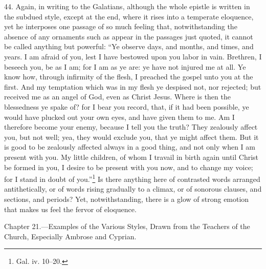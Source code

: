 44. Again, in writing to the Galatians, although the whole epistle is written in the subdued style, except at the end, where it rises into a temperate eloquence, yet he interposes one passage of so much feeling that, notwithstanding the absence of any ornaments such as appear in the passages just quoted, it cannot be called anything but powerful: “Ye observe days, and months, and times, and years. I am afraid of you, lest I have bestowed upon you labor in vain. Brethren, I beseech you, be as I am; for I am as ye are: ye have not injured me at all. Ye know how, through infirmity of the flesh, I preached the gospel unto you at the first. And my temptation which was in my flesh ye despised not, nor rejected; but received me as an angel of God, even as Christ Jesus. Where is then the blessedness ye spake of? for I bear you record, that, if it had been possible, ye would have plucked out your own eyes, and have given them to me. Am I therefore become your enemy, because I tell you the truth? They zealously affect you, but not well; yea, they would exclude you, that ye might affect them. But it is good to be zealously affected always in a good thing, and not only when I am present with you. My little children, of whom I travail in birth again until Christ be formed in you, I desire to be present with you now, and to change my voice; for I stand in doubt of you.”\footnote{Gal. iv. 10–20.} Is there anything here of contrasted words arranged antithetically, or of words rising gradually to a climax, or of sonorous clauses, and sections, and periods? Yet, notwithstanding, there is a glow of strong emotion that makes us feel the fervor of eloquence.


Chapter 21.—Examples of the Various Styles, Drawn from the Teachers of the Church, Especially Ambrose and Cyprian.


